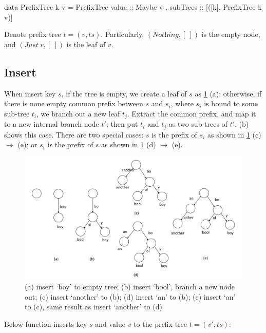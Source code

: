 \documentclass[b5paper]{article}
\begin{document}
\begin{Haskell}
data PrefixTree k v = PrefixTree { value :: Maybe v
                                 , subTrees :: [([k], PrefixTree k v)]}
\end{Haskell}

Denote prefix tree $t = (v, ts)$. Particularly, $(\textit{Nothing}, [\ ])$ is the empty node, and $(\textit{Just}\ v, [\ ])$ is the leaf of $v$.

\subsection{Insert}
When insert key $s$, if the tree is empty, we create a leaf of $s$ as \cref{fig:patricia-insert} (a); otherwise, if there is none empty common prefix between $s$ and $s_i$, where $s_i$ is bound to some sub-tree $t_i$, we branch out a new leaf $t_j$. Extract the common prefix, and map it to a new internal branch node $t'$; then put $t_i$ and $t_j$ as two sub-trees of $t'$.  (b) shows this case. There are two special cases: $s$ is the prefix of $s_i$ as shown in \cref{fig:patricia-insert} (c) $\to$ (e); or $s_i$ is the prefix of $s$ as shown in \cref{fig:patricia-insert} (d) $\to$ (e).

\begin{figure}[htbp]
  \centering
  \includegraphics[scale=0.4]{img/prefix-tree-insert}
  \caption{(a) insert `boy' to empty tree; (b) insert `bool', branch a new node out; (c) insert `another' to (b); (d) insert `an' to (b); (e) insert `an' to (c), same result as insert `another' to (d)}
  \label{fig:patricia-insert}
\end{figure}

Below function inserts key $s$ and value $v$ to the prefix tree $t = (v', ts)$:
\end{document}
